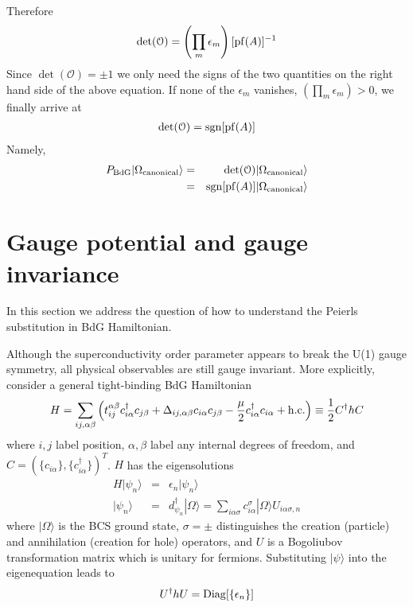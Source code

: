 Therefore
\begin{eqnarray}
	\det(\mathcal{O}) = \left(\prod_m \epsilon_m\right) [{\rm pf}(A)]^{-1}
\end{eqnarray}
Since $\det(\mathcal{O}) = \pm 1$ we only need the signs of the two quantities on the right hand side of the above equation. If none of the $\epsilon_m$ vanishes, $ \left(\prod_m \epsilon_m\right) > 0$, we finally arrive at
\begin{eqnarray}
	\det(\mathcal{O}) = {\rm sgn}[{\rm pf}(A)]
\end{eqnarray}
Namely,
\begin{eqnarray}
	P_{\rm BdG} |\Omega_{\rm canonical}\rangle &=& \det(\mathcal{O}) |\Omega_{\rm canonical}\rangle \\\nonumber
	&=& {\rm sgn}[{\rm pf}(A)]  |\Omega_{\rm canonical}\rangle
\end{eqnarray}

\section{Gauge potential and gauge invariance}
In this section we address the question of how to understand the Peierls substitution in BdG Hamiltonian.

Although the superconductivity order parameter appears to break the U(1) gauge symmetry, all physical observables are still gauge invariant. More explicitly, consider a general tight-binding BdG Hamiltonian
\begin{eqnarray}\label{eq:HBdGgeneral}
	H = \sum_{ij,\alpha\beta} \left(t_{ij}^{\alpha\beta}c_{i\alpha}^\dag c_{j\beta} + \Delta_{ij,\alpha\beta} c_{i\alpha}c_{j\beta} - \frac{\mu}{2}c_{i\alpha}^\dag c_{i\alpha} + {\rm h.c.} \right) \equiv \frac{1}{2}C^\dag h C
\end{eqnarray}
where $i,j$ label position, $\alpha,\beta$ label any internal degrees of freedom, and $C = (\{c_{i\alpha}\},\{c^\dag_{i\alpha}\})^T$. $H$ has the eigensolutions
\begin{eqnarray}
	H |\psi_n\rangle &=& \epsilon_n |\psi_n\rangle \\\nonumber
	|\psi_n\rangle &=& d^\dag_{\psi_n} |\Omega\rangle = \sum_{i\alpha\sigma}c^{\sigma}_{i\alpha} | \Omega\rangle U_{i\alpha\sigma,n}
\end{eqnarray}
where $|\Omega\rangle$ is the BCS ground state, $\sigma=\pm$ distinguishes the creation (particle) and annihilation (creation for hole) operators, and $U$ is a Bogoliubov transformation matrix which is unitary for fermions. Substituting $|\psi\rangle$ into the eigenequation leads to
\begin{eqnarray}
	U^\dag h U = {\rm Diag}[\{\epsilon_n\}]
\end{eqnarray}

